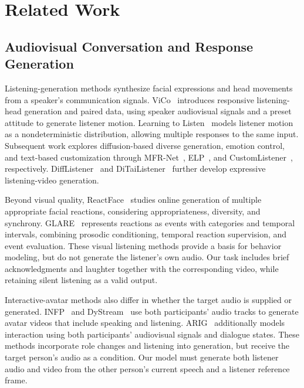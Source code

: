 \section{Related Work}
\label{sec:related}
\subsection{Audiovisual Conversation and Response Generation}
Listening-generation methods synthesize facial expressions and head movements from a speaker's communication signals. ViCo~\cite{vico} introduces responsive listening-head generation and paired data, using speaker audiovisual signals and a preset attitude to generate listener motion. Learning to Listen~\cite{learningtolisten} models listener motion as a nondeterministic distribution, allowing multiple responses to the same input. Subsequent work explores diffusion-based diverse generation, emotion control, and text-based customization through MFR-Net~\cite{mfrnet}, ELP~\cite{elp}, and CustomListener~\cite{customlistener}, respectively. DiffListener~\cite{difflistener} and DiTaiListener~\cite{ditailistener} further develop expressive listening-video generation.

Beyond visual quality, ReactFace~\cite{reactface} studies online generation of multiple appropriate facial reactions, considering appropriateness, diversity, and synchrony. GLARE~\cite{glare} represents reactions as events with categories and temporal intervals, combining prosodic conditioning, temporal reaction supervision, and event evaluation. These visual listening methods provide a basis for behavior modeling, but do not generate the listener's own audio. Our task includes brief acknowledgments and laughter together with the corresponding video, while retaining silent listening as a valid output.

Interactive-avatar methods also differ in whether the target audio is supplied or generated. INFP~\cite{infp} and DyStream~\cite{dystream} use both participants' audio tracks to generate avatar videos that include speaking and listening. ARIG~\cite{arig} additionally models interaction using both participants' audiovisual signals and dialogue states. These methods incorporate role changes and listening into generation, but receive the target person's audio as a condition. Our model must generate both listener audio and video from the other person's current speech and a listener reference frame.


